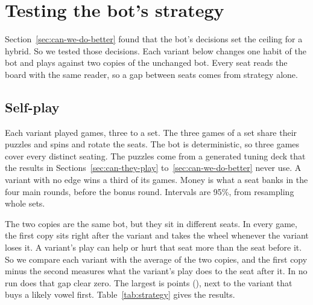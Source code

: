 \section{Testing the bot's strategy}\label{sec:strategy}

Section~\ref{sec:can-we-do-better} found that the bot's decisions set the ceiling for a hybrid. So we tested those decisions. Each variant below changes one habit of the bot and plays against two copies of the unchanged bot. Every seat reads the board with the same reader, so a gap between seats comes from strategy alone.

\subsection{Self-play}

Each variant played \VariantMilkGames{} games, three to a set. The three games of a set share their puzzles and spins and rotate the seats. The bot is deterministic, so three games cover every distinct seating. The puzzles come from a generated tuning deck that the results in Sections~\ref{sec:can-they-play} to~\ref{sec:can-we-do-better} never use. A variant with no edge wins a third of its games. Money is what a seat banks in the four main rounds, before the bonus round. Intervals are 95\%, from resampling whole sets.

The two copies are the same bot, but they sit in different seats. In every game, the first copy sits right after the variant and takes the wheel whenever the variant loses it. A variant's play can help or hurt that seat more than the seat before it. So we compare each variant with the average of the two copies, and the first copy minus the second measures what the variant's play does to the seat after it. In no run does that gap clear zero. The largest is \VariantVowelsAfterMinusBefore{} points (\VariantVowelsAfterMinusBeforeCI), next to the variant that buys a likely vowel first. Table~\ref{tab:strategy} gives the results.

